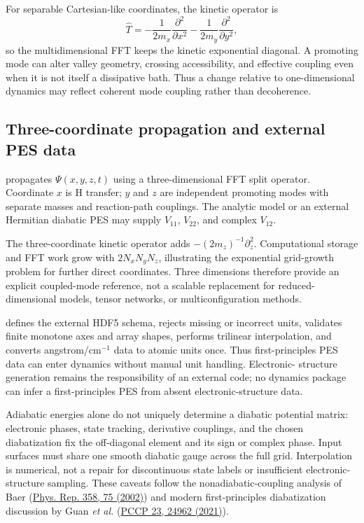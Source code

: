 \documentclass[11pt]{article}
\newcommand{\code}[1]{\texttt{\detokenize{#1}}}
\begin{document}
For separable Cartesian-like coordinates, the kinetic operator is
\begin{equation}
 \hat T=-\frac{1}{2m_x}\frac{\partial^2}{\partial x^2}
        -\frac{1}{2m_y}\frac{\partial^2}{\partial y^2},
\end{equation}
so the multidimensional FFT keeps the kinetic exponential diagonal. A promoting
mode can alter valley geometry, crossing accessibility, and effective coupling even
when it is not itself a dissipative bath. Thus a change relative to one-dimensional
dynamics may reflect coherent mode coupling rather than decoherence.

\subsection{Three-coordinate propagation and external PES data}

\code{multidimensional_transfer_3d.py} propagates
$\Psi(x,y,z,t)$ using a three-dimensional FFT split operator. Coordinate $x$ is
H transfer; $y$ and $z$ are independent promoting modes with separate masses and
reaction-path couplings. The analytic model or an external Hermitian diabatic PES
may supply $V_{11}$, $V_{22}$, and complex $V_{12}$.

The three-coordinate kinetic operator adds
$-(2m_z)^{-1}\partial_z^2$. Computational storage and FFT work grow with
$2N_xN_yN_z$, illustrating the exponential grid-growth problem for further direct
coordinates. Three dimensions therefore provide an explicit coupled-mode reference,
not a scalable replacement for reduced-dimensional models, tensor networks, or
multiconfiguration methods.

\code{potential_data.py} defines the external HDF5 schema, rejects missing or
incorrect units, validates finite monotone axes and array shapes, performs trilinear
interpolation, and converts angstrom/cm$^{-1}$ data to atomic units once. Thus
first-principles PES data can enter dynamics without manual unit handling. Electronic-
structure generation remains the responsibility of an external code; no dynamics
package can infer a first-principles PES from absent electronic-structure data.

Adiabatic energies alone do not uniquely determine a diabatic potential matrix:
electronic phases, state tracking, derivative couplings, and the chosen diabatization
fix the off-diagonal element and its sign or complex phase. Input surfaces must share
one smooth diabatic gauge across the full grid. Interpolation is numerical, not a
repair for discontinuous state labels or insufficient electronic-structure sampling.
These caveats follow the nonadiabatic-coupling analysis of Baer
(\href{https://doi.org/10.1016/S0370-1573(01)00052-7}{Phys. Rep. 358, 75 (2002)})
and modern first-principles diabatization discussion by Guan \emph{et al.}
(\href{https://doi.org/10.1039/D1CP03008F}{PCCP 23, 24962 (2021)}).
\end{document}
